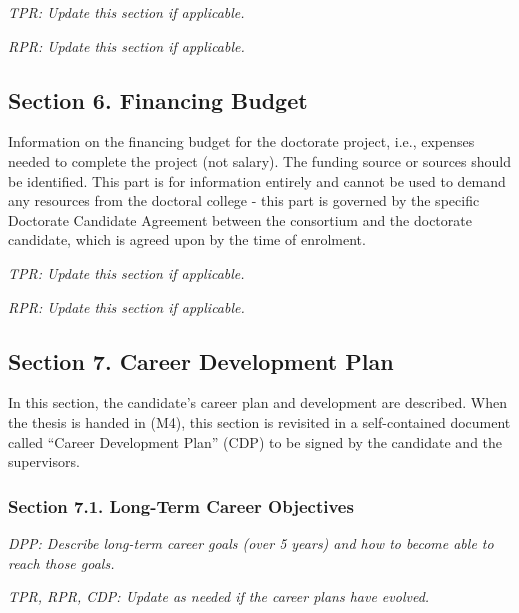 \documentclass[12pt]{article}
\begin{document}
\begin{shaded}
\noindent
\emph{TPR: Update this section if applicable.}

\noindent
\emph{RPR: Update this section if applicable.}
\end{shaded}

\subsection*{Section 6. Financing Budget}

Information on the financing budget for the doctorate project, i.e., expenses needed to complete the project (not salary). The funding source or sources should be identified. This part is for information entirely and cannot be used to demand any resources from the doctoral college - this part is governed by the specific Doctorate Candidate Agreement between the consortium and the doctorate candidate, which is agreed upon by the time of enrolment.

\begin{shaded}
\noindent
\emph{TPR: Update this section if applicable.}

\noindent
\emph{RPR: Update this section if applicable.}
\end{shaded}

\subsection*{Section 7. Career Development Plan}
In this section, the candidate's career plan and development are described. When the thesis is handed in (M4), this section is revisited in a self-contained document called ``Career Development Plan'' (CDP) to be signed by the candidate and the supervisors.

\subsubsection*{Section 7.1. Long-Term Career Objectives}
\begin{shaded}
\noindent
\emph{DPP: Describe long-term career goals (over 5 years) and how to become able to reach those goals.}

\noindent
\emph{TPR, RPR, CDP: Update as needed if the career plans have evolved.}

\end{shaded}
\end{document}
